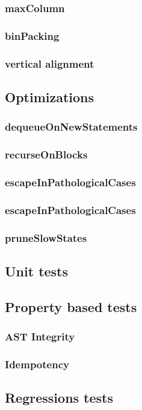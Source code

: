 \documentclass[11pt,a4paper]{article}
\begin{document}
\subsubsection{maxColumn}
\subsubsection{binPacking}
\subsubsection{vertical alignment}
\subsection{Optimizations}
\subsubsection{dequeueOnNewStatements}
\subsubsection{recurseOnBlocks}
\subsubsection{escapeInPathologicalCases}
\subsubsection{escapeInPathologicalCases}
\subsubsection{pruneSlowStates}
\subsection{Unit tests}
\subsection{Property based tests}
\subsubsection{AST Integrity}
\subsubsection{Idempotency}
\subsection{Regressions tests}
\end{document}
